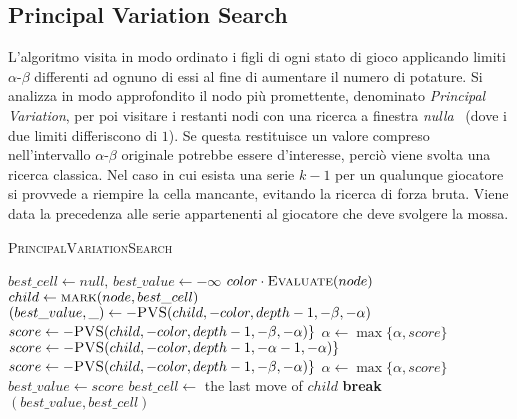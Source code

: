 \documentclass{article}
\begin{document}
\subsection{Principal Variation Search}

L'algoritmo visita in modo ordinato i figli di ogni stato di gioco applicando
limiti $\alpha$-$\beta$ differenti ad ognuno di essi al fine di aumentare il numero di potature.
Si analizza in modo approfondito il nodo pi\`u promettente, denominato \emph{Principal
Variation}, per poi visitare i restanti nodi con una ricerca a finestra \emph{nulla}~\cite{scout}
(dove i due limiti differiscono di $1$). Se questa restituisce un valore compreso
nell'intervallo $\alpha$-$\beta$ originale potrebbe essere d'interesse, perci\`o
viene svolta una ricerca classica.
Nel caso in cui esista una serie $k-1$ per un qualunque giocatore si provvede a
riempire la cella mancante, evitando la ricerca di forza bruta. Viene data la
precedenza alle serie appartenenti al giocatore che deve svolgere la mossa.

\begin{algorithm}[H]
  \caption{\textsc{PrincipalVariationSearch}}
  \label{alg:pvs}
  \begin{algorithmic}[0]
      \State $best\_cell \gets null, \, best\_value \gets -\infty$
        \State \Return $color \cdot \Call{Evaluate}{node}$
        \State $child \gets \Call{mark}{node, best\_cell}$
        \State $(best\_value, \_) \gets -\Call{PVS}{child, -color, depth-1, -\beta, -\alpha}$
      \Else
            \State $score \gets -\Call{PVS}{child, -color, depth-1, -\beta, -\alpha}\}$
            \State $\alpha \gets \max\{\alpha, score\}$
          \Else
            \State $score \gets -\Call{PVS}{child, -color, depth-1, -\alpha-1, -\alpha}\}$
              \State $score \gets -\Call{PVS}{child, -color, depth-1, -\beta, -\alpha}\}$
              \State $\alpha \gets \max\{\alpha, score\}$
            \EndIf
          \EndIf
            \State $best\_value \gets score$
            \State $best\_cell \gets $ the last move of $child$
          \EndIf
            \State \textbf{break}
          \EndIf
        \EndFor
      \EndIf
      \State \Return $(best\_value, best\_cell)$
    \EndProcedure
  \end{algorithmic}
\end{algorithm}
\end{document}
